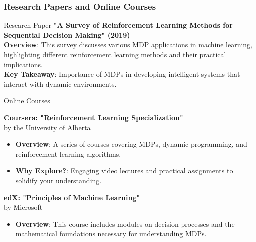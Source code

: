 \documentclass[aspectratio=169]{beamer}
\begin{document}
\begin{frame}[fragile]
    \frametitle{Research Papers and Online Courses}
    \begin{block}{Research Paper}
        \textbf{"A Survey of Reinforcement Learning Methods for Sequential Decision Making" (2019)} \\
        \textbf{Overview}: This survey discusses various MDP applications in machine learning, highlighting different reinforcement learning methods and their practical implications. \\
        \textbf{Key Takeaway}: Importance of MDPs in developing intelligent systems that interact with dynamic environments.
    \end{block}
    
    \begin{block}{Online Courses}
        \item \textbf{Coursera: "Reinforcement Learning Specialization"} \\
        by the University of Alberta \\
        \begin{itemize}
            \item \textbf{Overview}: A series of courses covering MDPs, dynamic programming, and reinforcement learning algorithms.
            \item \textbf{Why Explore?}: Engaging video lectures and practical assignments to solidify your understanding.
        \end{itemize}

        \item \textbf{edX: "Principles of Machine Learning"} \\
        by Microsoft \\
        \begin{itemize}
            \item \textbf{Overview}: This course includes modules on decision processes and the mathematical foundations necessary for understanding MDPs.
        \end{itemize}
    \end{block}
\end{frame}
\end{document}
